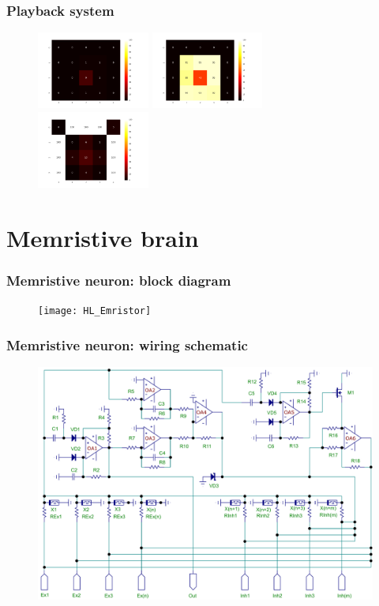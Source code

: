 \documentclass[12pt, aspectratio=169]{beamer}
\begin{document}
\begin{frame}
\frametitle{Playback system}
\begin{figure}
\includegraphics[width=0.33\textwidth]{layer5A_1}
\includegraphics[width=0.33\textwidth]{layer5A_2}
\includegraphics[width=0.33\textwidth]{layer5A_3}
\end{figure}
\end{frame}

\section{Memristive brain}

\begin{frame}
\frametitle{Memristive neuron: block diagram}
\begin{figure}
\texttt{[image: HL\_Emristor]}
\end{figure}
\end{frame}


\begin{frame}
\frametitle{Memristive neuron: wiring schematic}
\begin{figure}
\includegraphics[width=0.7\linewidth]{memristive_neuron_wiring}
\end{figure}
\end{frame}
\end{document}
